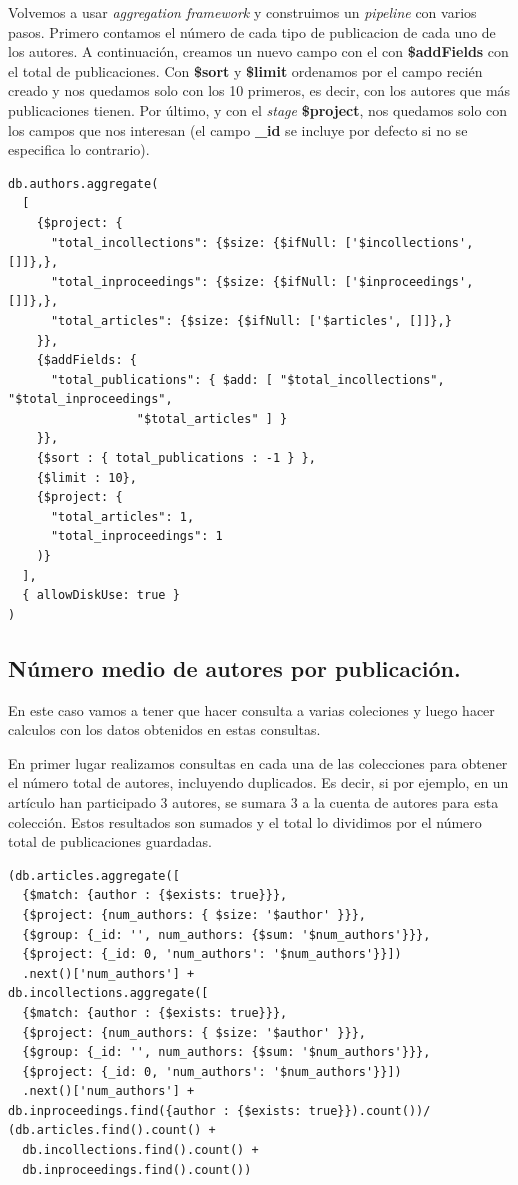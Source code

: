 Volvemos a usar \textit{aggregation framework} y construimos un \textit{pipeline} con varios pasos. Primero contamos el número de cada tipo de publicacion de cada uno de los autores. A continuación, creamos un nuevo campo con el con \textbf{\$addFields} con el total de publicaciones. Con \textbf{\$sort} y \textbf{\$limit} ordenamos por el campo recién creado y nos quedamos solo con los 10 primeros, es decir, con los autores que más publicaciones tienen. Por último, y con el \textit{stage} \textbf{\$project}, nos quedamos solo con los campos que nos interesan (el campo \textbf{\_id} se incluye por defecto si no se especifica lo contrario).

\begin{verbatim}
db.authors.aggregate(
  [
    {$project: {
      "total_incollections": {$size: {$ifNull: ['$incollections', []]},},
      "total_inproceedings": {$size: {$ifNull: ['$inproceedings', []]},},
      "total_articles": {$size: {$ifNull: ['$articles', []]},}
    }},
    {$addFields: {
      "total_publications": { $add: [ "$total_incollections", "$total_inproceedings",
                  "$total_articles" ] }
    }},
    {$sort : { total_publications : -1 } },
    {$limit : 10},
    {$project: {
      "total_articles": 1,
      "total_inproceedings": 1
    )}
  ],
  { allowDiskUse: true }
)
\end{verbatim}

\subsection{Número medio de autores por publicación.}

En este caso vamos a tener que hacer consulta a varias coleciones y luego hacer calculos con los datos obtenidos en estas consultas.

En primer lugar realizamos consultas en cada una de las colecciones para obtener el número total de autores, incluyendo duplicados. Es decir, si por ejemplo, en un artículo han participado 3 autores, se sumara 3 a la cuenta de autores para esta colección. Estos resultados son sumados y el total lo dividimos por el número total de publicaciones guardadas.

\begin{verbatim}
(db.articles.aggregate([
  {$match: {author : {$exists: true}}}, 
  {$project: {num_authors: { $size: '$author' }}}, 
  {$group: {_id: '', num_authors: {$sum: '$num_authors'}}}, 
  {$project: {_id: 0, 'num_authors': '$num_authors'}}])
  .next()['num_authors'] +
db.incollections.aggregate([
  {$match: {author : {$exists: true}}}, 
  {$project: {num_authors: { $size: '$author' }}}, 
  {$group: {_id: '', num_authors: {$sum: '$num_authors'}}}, 
  {$project: {_id: 0, 'num_authors': '$num_authors'}}])
  .next()['num_authors'] +
db.inproceedings.find({author : {$exists: true}}).count())/
(db.articles.find().count() + 
  db.incollections.find().count() + 
  db.inproceedings.find().count())
\end{verbatim}


